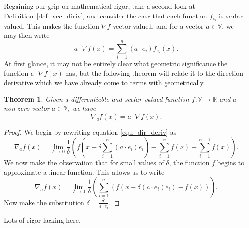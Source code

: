 \documentclass[12pt]{article}
\newcommand{\V}{\mathbb{V}}
\newcommand{\R}{\mathbb{R}}
\newtheorem{theorem}{Theorem}[section]
\begin{document}
Regaining our grip on mathematical rigor, take a second look at Definition~\ref{def_vec_diriv}, and
consider the case that each function $f_{e_i}$ is scalar-valued.  This makes the function $\nabla f$
vector-valued, and for a vector $a\in\V$, we may then write
\begin{equation}
a\cdot \nabla f(x) = \sum_{i=1}^n (a\cdot e_i)f_{e_i}(x).
\end{equation}
At first glance, it may not be entirely clear what geometric significance the
function $a\cdot \nabla f(x)$ has, but the following theorem will relate
it to the direction derivative which we have already come to terms with geometrically.
\begin{theorem}
Given a differentiable and scalar-valued function $f:\V\to\R$ and a non-zero vector $a\in\V$, we have
\begin{equation}
\nabla_a f(x) = a\cdot\nabla f(x).
\end{equation}
\end{theorem}
\begin{proof}
We begin by rewriting equation \eqref{equ_dir_deriv} as
\begin{equation}
\nabla_a f(x) = \lim_{\delta\to 0}\frac{1}{\delta}\left(f\left(x+\delta\sum_{i=1}^n (a\cdot e_i)e_i\right)-
\sum_{i=1}^n f(x)+\sum_{i=1}^{n-1} f(x)\right).
\end{equation}
We now make the observation that for small values of $\delta$, the function $f$ begins to
approximate a linear function.  This allows us to write
\begin{equation}
\nabla_a f(x)=\lim_{\delta\to 0}\frac{1}{\delta}\left(\sum_{i=1}^n (f(x+\delta (a\cdot e_i)e_i)-f(x))\right).
\end{equation}
Now make the substitution $\delta=\frac{\delta'}{a\cdot e_i}$.
\end{proof}
Lots of rigor lacking here.
\end{document}
